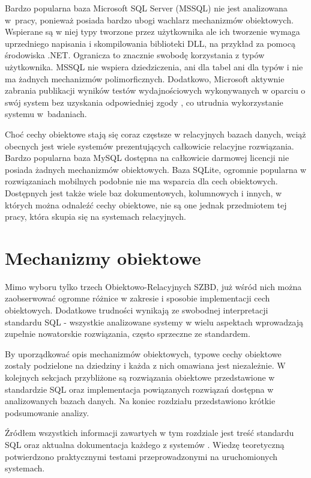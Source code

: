 \documentclass[a4paper,twoside,12pt]{book}
\begin{document}
Bardzo popularna baza Microsoft SQL Server (MSSQL) nie jest analizowana w~pracy, ponieważ posiada bardzo ubogi wachlarz mechanizmów obiektowych. Wspierane są w niej typy tworzone przez użytkownika ale ich tworzenie wymaga uprzedniego napisania i skompilowania biblioteki DLL, na przykład za pomocą środowiska .NET. Ogranicza to znacznie swobodę korzystania z typów użytkownika. MSSQL nie wspiera dziedziczenia, ani dla tabel ani dla typów i nie ma żadnych mechanizmów polimorficznych. Dodatkowo, Microsoft aktywnie zabrania publikacji wyników testów wydajnościowych wykonywanych w oparciu o swój system bez uzyskania odpowiedniej zgody \cite{bib:mssql-license-agreement}, co utrudnia wykorzystanie systemu w~badaniach.

Choć cechy obiektowe stają się coraz częstsze w relacyjnych bazach danych, wciąż obecnych jest wiele systemów prezentujących całkowicie relacyjne rozwiązania. Bardzo popularna baza MySQL dostępna na całkowicie darmowej licencji nie posiada żadnych mechanizmów obiektowych. Baza SQLite, ogromnie popularna w rozwiązaniach mobilnych podobnie nie ma wsparcia dla cech obiektowych. Dostępnych jest także wiele baz dokumentowych, kolumnowych i innych, w których można odnaleźć cechy obiektowe, nie są one jednak przedmiotem tej pracy, która skupia się na systemach relacyjnych.

\chapter{Mechanizmy obiektowe}

Mimo wyboru tylko trzech Obiektowo-Relacyjnych SZBD, już wśród nich można zaobserwować ogromne różnice w zakresie i sposobie implementacji cech obiektowych. Dodatkowe trudności wynikają ze swobodnej interpretacji standardu SQL - wszystkie analizowane systemy w wielu aspektach wprowadzają zupełnie nowatorskie rozwiązania, często sprzeczne ze standardem.

By uporządkować opis mechanizmów obiektowych, typowe cechy obiektowe zostały podzielone na dziedziny i każda z nich omawiana jest niezależnie. W kolejnych sekcjach przybliżone są rozwiązania obiektowe przedstawione w standardzie SQL oraz implementacja powiązanych rozwiązań dostępna w analizowanych bazach danych. Na koniec rozdziału przedstawiono krótkie podsumowanie analizy.

Źródłem wszystkich informacji zawartych w tym rozdziale jest treść standardu SQL \cite{bib:sql-standard-part-2-foundation,bib:sql-standard-part-10-olb} oraz aktualna dokumentacja każdego z systemów \cite{bib:oracle-database-concepts,bib:db2-documentation,bib:postgres-documentation}. Wiedzę teoretyczną potwierdzono praktycznymi testami przeprowadzonymi na uruchomionych systemach.
\end{document}
